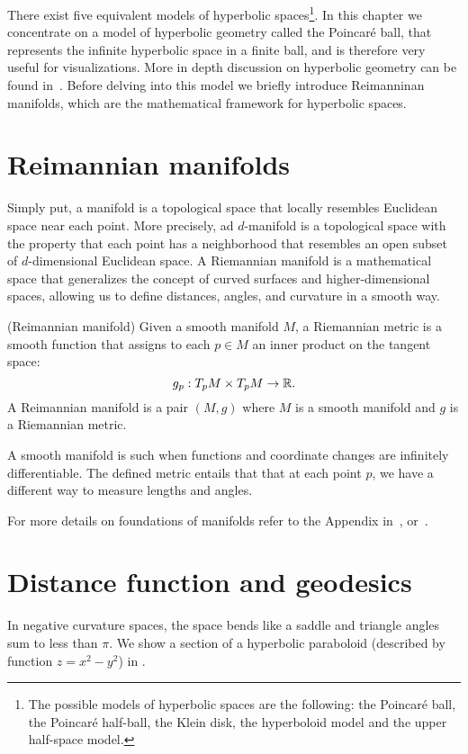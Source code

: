 There exist five equivalent models of hyperbolic spaces\footnote{The possible models of hyperbolic spaces are the following: the Poincaré ball, the Poincaré half-ball, the Klein disk, the hyperboloid model and the upper half-space model.}. In this chapter we concentrate on a model of hyperbolic geometry called the Poincaré ball, that represents the infinite hyperbolic space in a finite ball, and is therefore very useful for visualizations. More in depth discussion on hyperbolic geometry can be found in~\cite{Anderson2006hyperbolicGeometry}\cite{Ramsay2013introductionHyperbolicGeometry}. Before delving into this model we briefly introduce Reimanninan manifolds, which are the mathematical framework for hyperbolic spaces.

\section{Reimannian manifolds}
Simply put, a manifold is a topological space that locally resembles Euclidean space near each point. More precisely, ad $d$-manifold  is a topological space with the property that each point has a neighborhood that resembles an open subset of $d$-dimensional Euclidean space. A Riemannian manifold is a mathematical space that generalizes the concept of curved surfaces and higher-dimensional spaces, allowing us to define distances, angles, and curvature in a smooth way. 

\begin{definition} (Reimannian manifold)
Given a smooth manifold $M$, a Riemannian metric is a smooth function that assigns to each $p \in M$ an inner product on the tangent space:
\begin{equation*}
    g_p: T_pM \times T_pM \to \mathbb{R}.
\end{equation*}
    A Reimannian manifold is a pair $(M,g)$ where $M$ is a smooth manifold and $g$ is a Riemannian metric.
\end{definition}

A smooth manifold is such when functions and coordinate changes are infinitely differentiable. The defined metric entails that that at each point $p$, we have a different way to measure lengths and angles.

For more details on foundations of manifolds refer to the Appendix in~\cite{Chami2021representationLearningAlgorithmsHyperbolicSpaces}, or~\cite{doCarmo1992riemannianGeometry}\cite{Lee2003smooth}.


\section{Distance function and geodesics}

In negative curvature spaces, the space bends like a saddle and triangle angles sum to less than $\pi$. We show a section of a hyperbolic paraboloid (described by function $z=x^2-y^2$) in .

